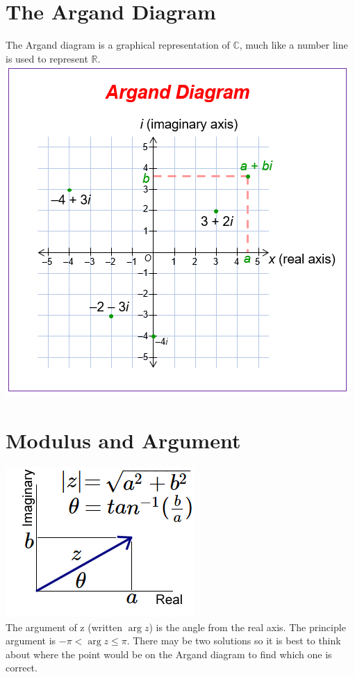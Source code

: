 \documentclass[a4paper,12pt]{article}
\begin{document}
\section*{The Argand Diagram}
The Argand diagram is a graphical representation of $\mathbb{C}$, much like a number line is used to represent $\mathbb{R}$. \\
\includegraphics[scale=0.5]{argandDiagram} \\

\section*{Modulus and Argument}
\includegraphics[scale=0.5]{ModulusandArgument} \\
The argument of z (written $\arg z$) is the angle from the real axis. The principle argument is $-\pi < \arg z \leqslant \pi$. There may be two solutions so it is best to think about where the point would be on the Argand diagram to find which one is correct. \\
\end{document}

